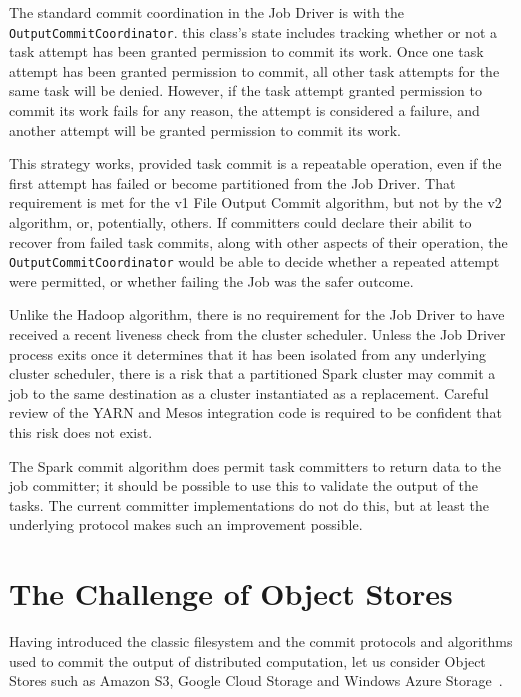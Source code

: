\documentclass[conference]{IEEEtran}
\begin{document}
The standard commit coordination in the Job Driver is with the
\texttt{OutputCommitCoordinator}.
this class's state includes tracking whether or not a task attempt
has been granted permission to commit its work.
Once one task attempt has been granted permission to commit,
all other task attempts for the same task will be denied.
However, if the task attempt granted permission to commit its work fails
for any reason, the attempt is considered a failure, and
another attempt will be granted permission to commit its work.

This strategy works, provided task commit is a repeatable operation,
even if the first attempt has failed or become partitioned from the
Job Driver.
That requirement is met for the v1 File Output Commit algorithm, but not
by the v2 algorithm, or, potentially, others.
If committers could declare their abilit to recover from
failed task commits, along with other aspects of their operation,
the \texttt{OutputCommitCoordinator} would be able to decide whether
a repeated attempt were permitted, or whether failing the Job was the
safer outcome.


Unlike the Hadoop algorithm, there is no requirement for the Job Driver
to have received a recent liveness check from the cluster scheduler.
Unless the Job Driver process exits once it determines that it has been
isolated from any underlying cluster scheduler, there is a risk that
a partitioned Spark cluster may commit a job to the same destination
as a cluster instantiated as a replacement.
Careful review of the YARN and Mesos integration code is required to be
confident that this risk does not exist.

The Spark commit algorithm does permit task committers to return data to
the job committer;
it should be possible to use this to validate the output of the tasks.
The current committer implementations do not do this, but at least the underlying
protocol makes such an improvement possible.





\section{The Challenge of Object Stores}
\label{sec:object-stores}

Having introduced the classic filesystem and the commit protocols and algorithms
used to commit the output of distributed computation, let us consider
Object Stores such as Amazon S3, Google Cloud Storage and
Windows Azure Storage\ \cite{AWS-S3-intro,Calder11}.
\end{document}
